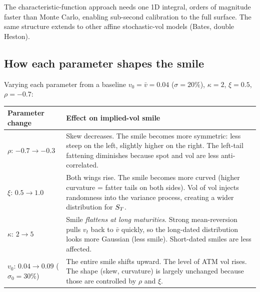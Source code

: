 \begin{keyfactbox}
The characteristic-function approach needs one 1D integral, orders
of magnitude faster than Monte Carlo, enabling sub-second calibration
to the full surface. The same structure extends to other affine
stochastic-vol models (Bates, double Heston).
\end{keyfactbox}

\subsection{How each parameter shapes the smile}
\label{subsec:heston_params_smile}

Varying each parameter from a baseline $v_0=\bar v=0.04$
($\sigma=20\%$), $\kappa=2$, $\xi=0.5$, $\rho=-0.7$:

\begin{center}
\begin{tabular}{lp{8cm}}
  \toprule
  Parameter change & Effect on implied-vol smile \\
  \midrule
  $\rho$: $-0.7 \to -0.3$ &
    Skew decreases.  The smile becomes more symmetric: less steep
    on the left, slightly higher on the right.  The left-tail fattening
    diminishes because spot and vol are less anti-correlated. \\[6pt]
  $\xi$: $0.5 \to 1.0$ &
    Both wings rise.  The smile becomes more curved (higher curvature
    = fatter tails on both sides).  Vol of vol injects randomness into
    the variance process, creating a wider distribution for
    $S_T$. \\[6pt]
  $\kappa$: $2 \to 5$ &
    Smile \emph{flattens at long maturities}.  Strong mean-reversion
    pulls $v_t$ back to $\bar{v}$ quickly, so the long-dated
    distribution looks more Gaussian (less smile).  Short-dated
    smiles are less affected. \\[6pt]
  $v_0$: $0.04 \to 0.09$ ($\sigma_0 = 30\%$) &
    The entire smile shifts upward.  The level of ATM vol rises.
    The shape (skew, curvature) is largely unchanged because those
    are controlled by $\rho$ and $\xi$. \\
  \bottomrule
\end{tabular}
\end{center}


